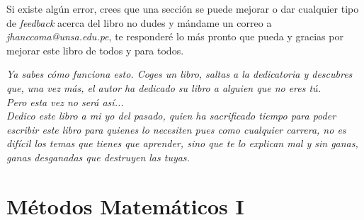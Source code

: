 \documentclass[
	11pt, %
	fleqn, %
	a4paper, %
]{LegrandOrangeBook}
\begin{document}
\noindent Si existe algún error, crees que una sección se puede mejorar o dar cualquier tipo de \textit{feedback} acerca del libro no dudes y mándame un correo a \textit{jhanccoma@unsa.edu.pe}, te responderé lo más pronto que pueda y gracias por mejorar este libro de todos y para todos.
\clearpage
\begin{center}
    \thispagestyle{empty}
    \vspace*{\fill}
    \textit{Ya sabes cómo funciona esto. Coges un libro, saltas a la dedicatoria y descubres que, una vez más, el autor ha dedicado su libro a alguien que no eres tú.\\
    Pero esta vez no será así...\\
    Dedico este libro a mi yo del pasado, quien ha sacrificado tiempo para poder escribir este libro para quienes lo necesiten pues como cualquier carrera, no es difícil los temas que tienes que aprender, sino que te lo explican mal y sin ganas, ganas  desganadas que destruyen las tuyas.}
    \vspace*{\fill}
\end{center}
\clearpage



\pagestyle{empty} %

\tableofcontents %

\cleardoublepage %

\pagestyle{fancy} %

\part{Métodos Matemáticos I}
\end{document}
